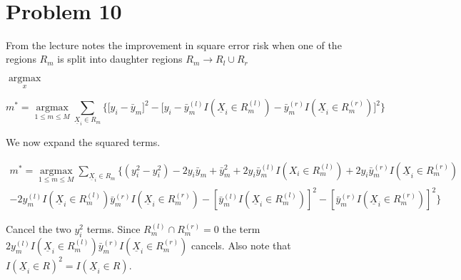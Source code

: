 \documentclass[11pt]{article}
\begin{document}
\newpage
\begin{center}
\ \\
\end{center}

\section*{Problem 10}
\setlength{\parindent}{0pt}

From the lecture notes the improvement in square error risk when one of the 
regions $R_m$ is split into daughter regions $R_m \to R_l \cup R_r$

$\underset{x}{\operatorname{argmax}}$

\begin{equation}
m^* = \underset{1 \leq m \leq M}{\operatorname{argmax}} 
\sum_{\underline{X}_i \in R_m} \Bigg\{\Big[y_i-\bar{y}_m\Big]^2-
\Big[y_i - \bar{y}_m^{(l)}I(\underline{X}_i \in R_m^{(l)})-
\bar{y}_m^{(r)}I(\underline{X}_i \in R_m^{(r)})\Big]^2\Bigg\}
\end{equation}

We now expand the squared terms. 

\begin{equation}
\begin{split}
m^* = \underset{1 \leq m \leq M}{\operatorname{argmax}} 
\sum_{\underline{X}_i \in R_m} \Bigg\{(y_i^2-y_i^2) -2y_i\bar{y}_m + \bar{y}_m^2 
+2y_i\bar{y}_m^{(l)}I(X_i \in R_m^{(l)}) 
+2y_i\bar{y}_m^{(r)}I(\underline{X}_i \in R_m^{(r)}) \\
- 2y_m^{(l)}I(\underline{X}_i \in R_m^{(l)})\bar{y}_m^{(r)}I(\underline{X}_i 
\in R_m^{(r)})-[\bar{y}_m^{(l)}I(\underline{X}_i 
\in R_m^{(l)})]^2-[\bar{y}_m^{(r)}I(\underline{X}_i \in R_m^{(r)})]^2\Bigg\}
\end{split}
\end{equation}

Cancel the two $y_i^2$ terms. Since $R_m^{(l)} \cap R_m^{(r)} = 0$ the term  
$2y_m^{(l)}I(\underline{X}_i 
\in R_m^{(l)})\bar{y}_m^{(r)}I(\underline{X}_i \in R_m^{(r)})$ 
cancels. Also note that $I(\underline{X}_i \in R)^2 = I(\underline{X}_i \in R)$.
\end{document}
